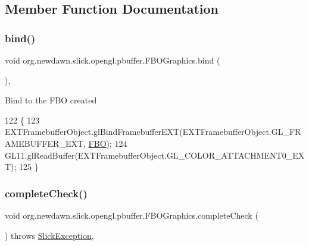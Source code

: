 \subsection{Member Function Documentation}
\mbox{\label{classorg_1_1newdawn_1_1slick_1_1opengl_1_1pbuffer_1_1_f_b_o_graphics_afb781a7fc3cb297e55a94440653a1bb3}} 
\subsubsection{\texorpdfstring{bind()}{bind()}}
{\footnotesize\ttfamily void org.\+newdawn.\+slick.\+opengl.\+pbuffer.\+F\+B\+O\+Graphics.\+bind (\begin{DoxyParamCaption}{ }\end{DoxyParamCaption})\hspace{0.3cm}{\ttfamily [inline]}, {\ttfamily [private]}}

Bind to the F\+BO created 
\begin{DoxyCode}
122                         \{
123         EXTFramebufferObject.glBindFramebufferEXT(EXTFramebufferObject.GL\_FRAMEBUFFER\_EXT, 
      \mbox{\hyperlink{classorg_1_1newdawn_1_1slick_1_1opengl_1_1pbuffer_1_1_f_b_o_graphics_a94baa0295ca9f8d804b98c49be9abc8a}{FBO}});
124         GL11.glReadBuffer(EXTFramebufferObject.GL\_COLOR\_ATTACHMENT0\_EXT);
125     \}
\end{DoxyCode}
\mbox{\label{classorg_1_1newdawn_1_1slick_1_1opengl_1_1pbuffer_1_1_f_b_o_graphics_a6ce997c28b1b5d958103057135340507}} 
\subsubsection{\texorpdfstring{complete\+Check()}{completeCheck()}}
{\footnotesize\ttfamily void org.\+newdawn.\+slick.\+opengl.\+pbuffer.\+F\+B\+O\+Graphics.\+complete\+Check (\begin{DoxyParamCaption}{ }\end{DoxyParamCaption}) throws \mbox{\hyperlink{classorg_1_1newdawn_1_1slick_1_1_slick_exception}{Slick\+Exception}}\hspace{0.3cm}{\ttfamily [inline]}, {\ttfamily [private]}}


